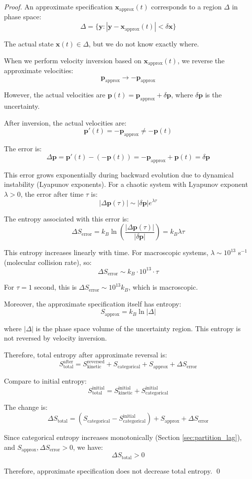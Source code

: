 \documentclass[twocolumn,10pt]{article}
\theoremstyle{definition}
\theoremstyle{remark}
\begin{document}
\begin{proof}
An approximate specification $\mathbf{x}_{\text{approx}}(t)$ corresponds to a region $\Delta$ in phase space:
$$
\Delta = \{\mathbf{y} : |\mathbf{y} - \mathbf{x}_{\text{approx}}(t)| < \delta \mathbf{x}\}
$$

The actual state $\mathbf{x}(t) \in \Delta$, but we do not know exactly where.

When we perform velocity inversion based on $\mathbf{x}_{\text{approx}}(t)$, we reverse the approximate velocities:
$$
\mathbf{p}_{\text{approx}} \to -\mathbf{p}_{\text{approx}}
$$

However, the actual velocities are $\mathbf{p}(t) = \mathbf{p}_{\text{approx}} + \delta \mathbf{p}$, where $\delta \mathbf{p}$ is the uncertainty.

After inversion, the actual velocities are:
$$
\mathbf{p}'(t) = -\mathbf{p}_{\text{approx}} \neq -\mathbf{p}(t)
$$

The error is:
$$
\Delta \mathbf{p} = \mathbf{p}'(t) - (-\mathbf{p}(t)) = -\mathbf{p}_{\text{approx}} + \mathbf{p}(t) = \delta \mathbf{p}
$$

This error grows exponentially during backward evolution due to dynamical instability (Lyapunov exponents). For a chaotic system with Lyapunov exponent $\lambda > 0$, the error after time $\tau$ is:
$$
|\Delta \mathbf{p}(\tau)| \sim |\delta \mathbf{p}| e^{\lambda \tau}
$$

The entropy associated with this error is:
$$
\Delta S_{\text{error}} = k_B \ln\left(\frac{|\Delta \mathbf{p}(\tau)|}{|\delta \mathbf{p}|}\right) = k_B \lambda \tau
$$

This entropy increases linearly with time. For macroscopic systems, $\lambda \sim 10^{13}$ s$^{-1}$ (molecular collision rate), so:
$$
\Delta S_{\text{error}} \sim k_B \cdot 10^{13} \cdot \tau
$$

For $\tau = 1$ second, this is $\Delta S_{\text{error}} \sim 10^{13} k_B$, which is macroscopic.

Moreover, the approximate specification itself has entropy:
$$
S_{\text{approx}} = k_B \ln|\Delta|
$$

where $|\Delta|$ is the phase space volume of the uncertainty region. This entropy is not reversed by velocity inversion.

Therefore, total entropy after approximate reversal is:
$$
S_{\text{total}}^{\text{after}} = S_{\text{kinetic}}^{\text{reversed}} + S_{\text{categorical}} + S_{\text{approx}} + \Delta S_{\text{error}}
$$

Compare to initial entropy:
$$
S_{\text{total}}^{\text{initial}} = S_{\text{kinetic}}^{\text{initial}} + S_{\text{categorical}}^{\text{initial}}
$$

The change is:
$$
\Delta S_{\text{total}} = (S_{\text{categorical}} - S_{\text{categorical}}^{\text{initial}}) + S_{\text{approx}} + \Delta S_{\text{error}}
$$

Since categorical entropy increases monotonically (Section \ref{sec:partition_lag}), and $S_{\text{approx}}, \Delta S_{\text{error}} > 0$, we have:
$$
\Delta S_{\text{total}} > 0
$$

Therefore, approximate specification does not decrease total entropy. \qed
\end{proof}
\end{document}
